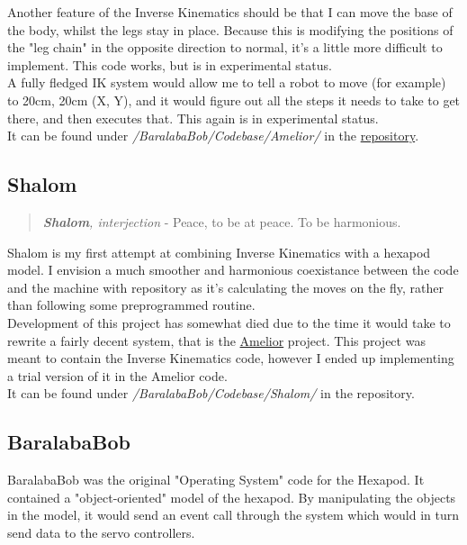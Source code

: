 					Another feature of the Inverse Kinematics should be that I can move the base of the body, whilst the legs stay in place. Because this is modifying the positions of the "leg chain" in the opposite direction to normal, it's a little more difficult to implement. This code works, but is in experimental status.\\
					
					A fully fledged IK system would allow me to tell a robot to move (for example) to 20cm, 20cm (X, Y), and it would figure out all the steps it needs to take to get there, and then executes that. This again is in experimental status.\\
				
					It can be found under \textit{/BaralabaBob/Codebase/Amelior/} in the \hyperref[Repository]{repository}.\\

			\subsection{Shalom}
				\begin{quote}
					\textit{\textbf{Shalom}, interjection} - Peace, to be at peace. To be harmonious.
				\end{quote}
				
				Shalom is my first attempt at combining Inverse Kinematics with a hexapod model. I envision a much smoother and harmonious coexistance between the code and the machine with repository as it's calculating the moves on the fly, rather than following some preprogrammed routine.\\
				
				Development of this project has somewhat died due to the time it would take to rewrite a fairly decent system, that is the \hyperref[Amelior]{Amelior} project. This project was meant to contain the Inverse Kinematics code, however I ended up implementing a trial version of it in the Amelior code.\\
				
				It can be found under \textit{/BaralabaBob/Codebase/Shalom/} in the repository.\\

			\subsection{BaralabaBob}
				\label{BaralabaBob}
				BaralabaBob was the original "Operating System" code for the Hexapod. It contained a "object-oriented" model of the hexapod. By manipulating the objects in the model, it would send an event call through the system which would in turn send data to the servo controllers.\\
				

